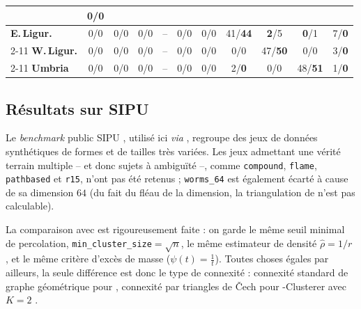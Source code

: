 \begin{table}[htbp]
\begin{tabular}{@{}l*{9}{c}c@{}}
  & {\color[HTML]{C0C0C0}0/0}\\
\midrule
{\color[HTML]{32CB00}\textbf{E.\,Ligur.}}
  & {\color[HTML]{C0C0C0}0/0} & {\color[HTML]{C0C0C0}0/0} & {\color[HTML]{C0C0C0}0/0}
  & -- & {\color[HTML]{C0C0C0}0/0} & {\color[HTML]{C0C0C0}0/0} & 41/\textbf{44}
  & \textbf{2}/5 & \textbf{0}/1 & 7/\textbf{0}\\
\cmidrule(lr){2-11}
{\color[HTML]{34FF34}\textbf{W.\,Ligur.}}
  & {\color[HTML]{C0C0C0}0/0} & {\color[HTML]{C0C0C0}0/0} & {\color[HTML]{C0C0C0}0/0}
  & -- & {\color[HTML]{C0C0C0}0/0} & {\color[HTML]{C0C0C0}0/0} & {\color[HTML]{C0C0C0}0/0}
  & 47/\textbf{50} & {\color[HTML]{C0C0C0}0/0} & 3/\textbf{0}\\
\cmidrule(lr){2-11}
{\color[HTML]{036400}\textbf{Umbria}}
  & {\color[HTML]{C0C0C0}0/0} & {\color[HTML]{C0C0C0}0/0} & {\color[HTML]{C0C0C0}0/0}
  & -- & {\color[HTML]{C0C0C0}0/0} & {\color[HTML]{C0C0C0}0/0} & 2/\textbf{0}
  & {\color[HTML]{C0C0C0}0/0} & 48/\textbf{51} & 1/\textbf{0}\\
\bottomrule
\end{tabular}%
\end{table}

\subsection{Résultats sur SIPU}
\label{subsec:chapV_sipu}

Le \emph{benchmark} public SIPU \cite{Sipu}, utilisé ici \emph{via}  \cite{Clustbench}, regroupe des jeux de données synthétiques de formes et de tailles très variées. Les jeux admettant une vérité terrain multiple -- et donc sujets à ambiguïté --, comme \texttt{compound}, \texttt{flame}, \texttt{pathbased} et \texttt{r15}, n'ont pas été retenus ; \texttt{worms\_64} est également écarté à cause de sa dimension $64$ (du fait du fléau de la dimension, la triangulation de  n'est pas calculable).

La comparaison avec \HDBSCAN \cite{HDBSCAN2017} est rigoureusement faite : on garde le même seuil minimal de percolation, \texttt{min\_cluster\_size}$=\sqrt n$, le même estimateur de densité $\widehat\rho=1/r$%
, et le même critère d'excès de masse ($\psi(t) = \tfrac1t$). Toutes choses égales par ailleurs, la seule différence est donc le type de connexité : connexité standard de graphe géométrique pour \HDBSCAN, connexité par triangles de \v Cech pour \HGP-Clusterer avec $K=2$ \cite{BibiAppliedNetworkScience}.

